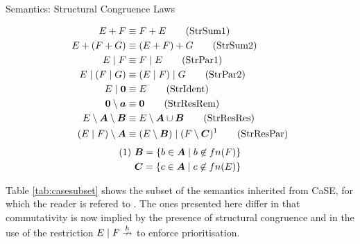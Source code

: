 \documentclass[orivec,envcountsame]{llncs}
\begin{document}
\begin{table}
  \caption{Semantics: Structural Congruence Laws}
 \label{tab:structcong}
 \vspace{-3mm}
  \shrule
  \begin{align}
   E + F & \equiv F + E \tag{StrSum1} \label{structsum1}
  \\
   E + (F + G) & \equiv (E + F) + G \tag{StrSum2} \label{structsum2}
   \\
    E \pc F & \equiv F \pc E \tag{StrPar1} \label{structpar1}
  \\
   E \pc (F \pc G) & \equiv (E \pc F) \pc G \tag{StrPar2} \label{structpar2}
 \\
    E \pc \nil & \equiv E \tag{StrIdent} \label{structident}
   \\
    \nil \setminus \vec{a} & \equiv \nil \tag{StrResRem}
   \label{structresremove}
   \\
    E \setminus \vec{A} \setminus \vec{B} & \equiv E \setminus \vec{A} \cup \vec{B}
   \tag{StrResRes} \label{structresres}
   \\
    (E \pc F) \setminus \vec{A} & \equiv (E \setminus \vec{B}) \pc (F
   \setminus \vec{C})^1 \tag{StrResPar} \label{structrespar}
\end{align}
\begin{align} 
   (1)\ & \vec{B} = \{b \in \vec{A} \pc b \not \in fn(F)\} \notag \\ 
   & \vec{C} = \{c \in \vec{A} \pc c \not \in fn(E)\} \notag
 \end{align} 
  \shrule
\end{table}

Table \ref{tab:casesubset} shows the subset of the semantics inherited
from CaSE, for which the reader is refered to \cite{case}.  The ones
presented here differ in that commutativity is now implied by the
presence of structural congruence and in the use of the restriction $E
\;|\; F \stackrel{h}{\nrightarrow}$ to enforce prioritisation.
\end{document}
